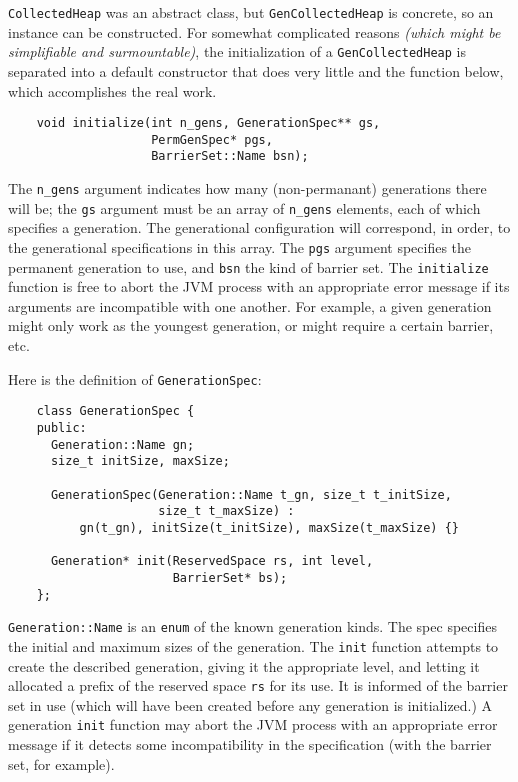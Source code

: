 \documentclass{article}
\begin{document}

{\tt CollectedHeap} was an abstract class, but {\tt GenCollectedHeap}
is concrete, so an instance can be constructed.  For somewhat
complicated reasons {\em (which might be simplifiable and
surmountable)}, the initialization of a {\tt GenCollectedHeap} is
separated into a default constructor that does very little and the
function below, which accomplishes the real work.
\begin{verbatim}
    void initialize(int n_gens, GenerationSpec** gs,
                    PermGenSpec* pgs,
                    BarrierSet::Name bsn);
\end{verbatim}
The {\tt n\_gens} argument indicates how many (non-permanant)
generations there will be; the {\tt gs} argument must be an array of
{\tt n\_gens} elements, each of which specifies a generation.  The
generational configuration will correspond, in order, to the
generational specifications in this array.  The {\tt pgs} argument
specifies the permanent generation to use, and {\tt bsn} the kind of
barrier set.  The {\tt initialize} function is free to abort the JVM
process with an appropriate error message if its arguments are
incompatible with one another.  For example, a given generation might
only work as the youngest generation, or might require a certain
barrier, etc.


Here is the definition of {\tt GenerationSpec}:
\begin{verbatim}
    class GenerationSpec {
    public:
      Generation::Name gn;
      size_t initSize, maxSize;

      GenerationSpec(Generation::Name t_gn, size_t t_initSize,
                     size_t t_maxSize) :
          gn(t_gn), initSize(t_initSize), maxSize(t_maxSize) {}

      Generation* init(ReservedSpace rs, int level,
                       BarrierSet* bs);
    };
\end{verbatim}
{\tt Generation::Name} is an {\tt enum} of the known generation
kinds.  The spec specifies the initial and maximum sizes of the
generation.  The {\tt init} function attempts to create the described
generation, giving it the appropriate level, and letting it allocated
a prefix of the reserved space {\tt rs} for its use.  It is informed
of the barrier set in use (which will have been created before any
generation is initialized.)  A generation {\tt init} function may abort
the JVM process with an appropriate error message if it detects some
incompatibility in the specification (with the barrier set, for
example).
\end{document}
